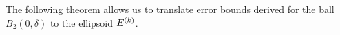 % 
% 
% 
% 
% 
% 
% 
% 
% 
% 
% 
% 
% 

The following theorem allows us to translate error bounds derived for the ball $B_2(0,\delta)$ to the ellipsoid ${E^{(k)}}$.




